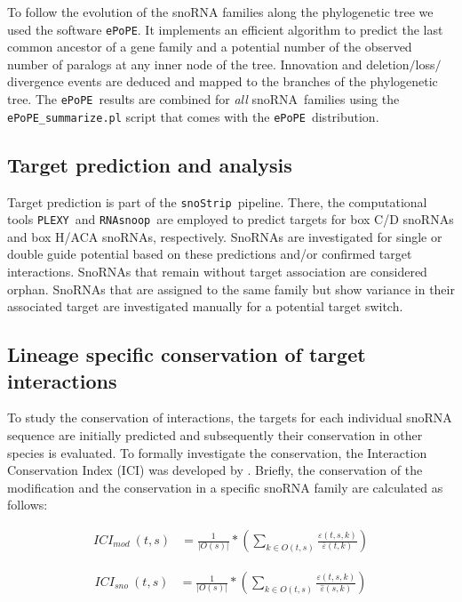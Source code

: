 \documentclass[preprint,3p,times,twocolumn]{elsarticle}
\newcommand{\sno}{snoRNA}
\newcommand{\cd}{box C/D snoRNA}
\newcommand{\haca}{box H/ACA snoRNA}
\newcommand{\snostrip}{\texttt{snoStrip}}
\newcommand{\epope}{\texttt{ePoPE}}
\newcommand{\plexy}{\texttt{PLEXY}}
\newcommand{\snoop}{\texttt{RNAsnoop}}
\begin{document}
To follow the evolution of the snoRNA families along the phylogenetic tree we used the software \epope\cite{Hertel:2015}. 
It implements an efficient algorithm to predict the last common ancestor of a gene family and a potential number of the observed number of paralogs at any inner node of the tree. 
Innovation and deletion$/$loss$/$divergence events are deduced and mapped to the branches of the phylogenetic tree. 
The \epope\ results are combined for \emph{all} \sno\ families 
using the \texttt{ePoPE\_summarize.pl} script that comes with the \epope\ distribution.

\subsection{Target prediction and analysis}

Target prediction is part of the \snostrip\ pipeline. There, the computational tools \plexy\ and \snoop\ are employed to predict targets for \cd s and \haca s, respectively. 
SnoRNAs are investigated for single or double guide potential based on these predictions and/or confirmed target interactions. SnoRNAs that remain without target association are considered orphan. SnoRNAs that are assigned to the same family but show variance in their associated target are investigated manually for a potential target switch.


\subsection{Lineage specific conservation of target interactions}
To study the conservation of interactions, the targets for each individual snoRNA sequence are initially predicted and subsequently their conservation in other species is evaluated. To formally investigate the conservation, the Interaction Conservation Index (ICI) was developed by \cite{Kehr:2014}. Briefly, the conservation of the modification and the conservation in a specific snoRNA family are calculated as follows:

\begin{equation}
  \begin{split}
    ICI_{mod}\:(t,s) & = \frac{1}{|O(s)|} * \left( \sum_{k\in O(t,s)} \frac{\varepsilon(t,s,k)}{\bar\varepsilon(t,k)} \right) 
  \end{split}
\end{equation}

\begin{equation}
  \begin{split}
    ICI_{sno}\:(t,s) & = \frac{1}{|O(s)|} * \left( \sum_{k\in O(t,s)} \frac{\varepsilon(t,s,k)}{\hat\varepsilon(s,k)} \right)
  \end{split}
\end{equation}
\end{document}
